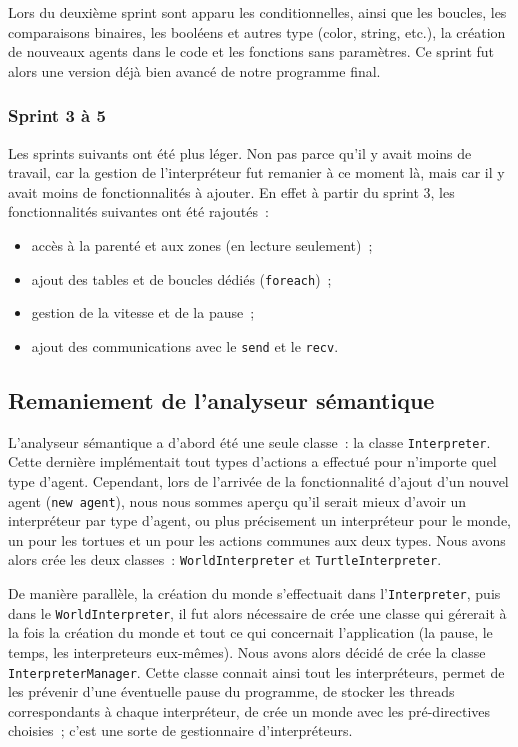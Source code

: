 Lors du deuxième sprint sont apparu les conditionnelles, ainsi que les boucles, les comparaisons binaires, les booléens et autres type (color, string, etc.), la création de nouveaux agents dans le code et les fonctions sans paramètres. Ce sprint fut alors une version déjà bien avancé de notre programme final.


\subsubsection{Sprint 3 à 5}
Les sprints suivants ont été plus léger. Non pas parce qu'il y avait moins de travail, car la gestion de l'interpréteur fut remanier à ce moment là, mais car il y avait moins de fonctionnalités à ajouter. En effet à partir du sprint 3, les fonctionnalités suivantes ont été rajoutés~:
\begin{itemize}
\item accès à la parenté et aux zones (en lecture seulement)~;
\item ajout des tables et de boucles dédiés (\verb|foreach|)~;
\item gestion de la vitesse et de la pause~;
\item ajout des communications avec le \verb|send| et le \verb|recv|.
\end{itemize}


\subsection{Remaniement de l'analyseur sémantique}
\label{remaniementInterpreter}

L'analyseur sémantique a d'abord été une seule classe~: la classe \verb|Interpreter|.
Cette dernière implémentait tout types d'actions a effectué pour n'importe quel type d'agent.
Cependant, lors de l'arrivée de la fonctionnalité d'ajout d'un nouvel agent (\verb|new agent|), nous nous sommes aperçu qu'il serait mieux d'avoir un interpréteur par type d'agent, ou plus précisement un interpréteur pour le monde, un pour les tortues et un pour les actions communes aux deux types.
Nous avons alors crée les deux classes~: \verb|WorldInterpreter| et \verb|TurtleInterpreter|.

De manière parallèle, la création du monde s'effectuait dans l'\verb|Interpreter|, puis dans le \verb|WorldInterpreter|, il fut alors nécessaire de crée une classe qui gérerait à la fois la création du monde et tout ce qui concernait l'application (la pause, le temps, les interpreteurs eux-mêmes). Nous avons alors décidé de crée la classe \verb|InterpreterManager|.
Cette classe connait ainsi tout les interpréteurs, permet de les prévenir d'une éventuelle pause du programme, de stocker les threads correspondants à chaque interpréteur, de crée un monde avec les pré-directives choisies~; c'est une sorte de gestionnaire d'interpréteurs.
